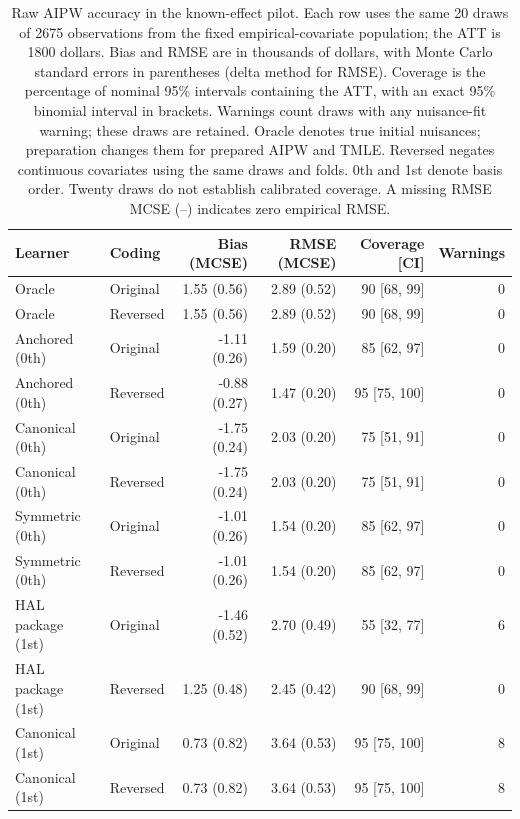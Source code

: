 \begin{table}[htbp]
\centering
\small
\caption{Raw AIPW accuracy in the known-effect pilot. Each row uses the same 20 draws of 2675 observations from the fixed empirical-covariate population; the ATT is 1800 dollars. Bias and RMSE are in thousands of dollars, with Monte Carlo standard errors in parentheses (delta method for RMSE). Coverage is the percentage of nominal 95\% intervals containing the ATT, with an exact 95\% binomial interval in brackets. Warnings count draws with any nuisance-fit warning; these draws are retained. Oracle denotes true initial nuisances; preparation changes them for prepared AIPW and TMLE. Reversed negates continuous covariates using the same draws and folds. 0th and 1st denote basis order. Twenty draws do not establish calibrated coverage. A missing RMSE MCSE (--) indicates zero empirical RMSE.}
\label{tab:semisynth-aipw_raw}

\begin{tabular}{llrrrr}
\toprule
Learner & Coding & Bias (MCSE) & RMSE (MCSE) & Coverage [CI] & Warnings\\
\midrule
Oracle & Original & 1.55 (0.56) & 2.89 (0.52) & 90 [68, 99] & 0\\
Oracle & Reversed & 1.55 (0.56) & 2.89 (0.52) & 90 [68, 99] & 0\\
\addlinespace
Anchored (0th) & Original & -1.11 (0.26) & 1.59 (0.20) & 85 [62, 97] & 0\\
Anchored (0th) & Reversed & -0.88 (0.27) & 1.47 (0.20) & 95 [75, 100] & 0\\
\addlinespace
Canonical (0th) & Original & -1.75 (0.24) & 2.03 (0.20) & 75 [51, 91] & 0\\
Canonical (0th) & Reversed & -1.75 (0.24) & 2.03 (0.20) & 75 [51, 91] & 0\\
\addlinespace
Symmetric (0th) & Original & -1.01 (0.26) & 1.54 (0.20) & 85 [62, 97] & 0\\
Symmetric (0th) & Reversed & -1.01 (0.26) & 1.54 (0.20) & 85 [62, 97] & 0\\
\addlinespace
HAL package (1st) & Original & -1.46 (0.52) & 2.70 (0.49) & 55 [32, 77] & 6\\
HAL package (1st) & Reversed & 1.25 (0.48) & 2.45 (0.42) & 90 [68, 99] & 0\\
\addlinespace
Canonical (1st) & Original & 0.73 (0.82) & 3.64 (0.53) & 95 [75, 100] & 8\\
Canonical (1st) & Reversed & 0.73 (0.82) & 3.64 (0.53) & 95 [75, 100] & 8\\
\bottomrule
\end{tabular}
\end{table}
